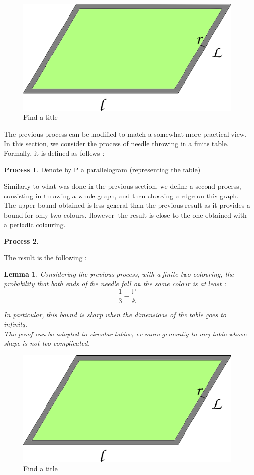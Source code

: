 \documentclass[a4paper,11pt]{article}
\newtheorem{lemma}{Lemma}
\theoremstyle{definition}
\newtheorem{process}{Process}
\theoremstyle{remark}
\begin{document}
\begin{figure}[h]
\center
\includegraphics[scale=0.5]{tablefinie.png}
\caption{\label{étiquette} Find a title}
\flushleft
\end{figure}
The previous process can be modified to match a somewhat more practical view. In this section, we consider the process of needle throwing in a finite table. 
Formally, it is defined as follows :
\begin{process}
Denote by P a parallelogram (representing the table)

\end{process}
Similarly to what was done in the previous section, we define a second process, consisting in throwing a whole graph, and then choosing a edge on this graph.
The upper bound obtained is less general than the previous result as it provides a bound for only two colours. However, the result is close to the one obtained with a periodic colouring. 

\begin{process}

\end{process}
The result is the following :
\begin{lemma}
Considering the previous process, with a finite two-colouring, the probability that both ends of the needle fall on the same colour is at least : $$ \frac13 - \frac{\mathbb{P}}{\mathbb{A}} $$

In particular, this bound is sharp when the dimensions of the table goes to infinity.\\
The proof can be adapted to circular tables, or more generally to any table whose shape is not too complicated.
\end{lemma}

\begin{figure}[center]
\center
\includegraphics[scale=0.5]{tablefinie.png}
\caption{\label{étiquette} Find a title}
\flushleft
\end{figure}
\end{document}
